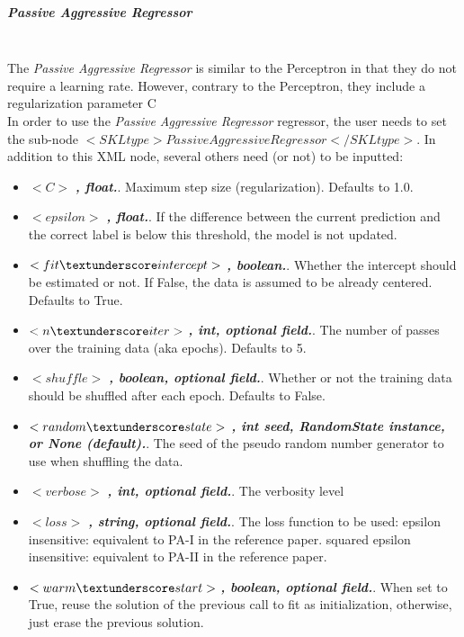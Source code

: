 \subparagraph{Passive Aggressive Regressor}
\mbox{}
\\The \textit{Passive Aggressive Regressor} is similar to the Perceptron in that they do not require a learning rate. However, contrary to the Perceptron, they include a regularization parameter C
\\In order to use the \textit{Passive Aggressive Regressor} regressor, the user needs to set the sub-node $<SKLtype>PassiveAggressiveRegressor</SKLtype>$.
In addition to this XML node, several others need (or not) to be inputted:
\begin{itemize}
  \item $<C>$ \textbf{\textit{, float.}}. Maximum step size (regularization). Defaults to 1.0.
  \item $<epsilon>$ \textbf{\textit{, float.}}. If the difference between the current prediction and the correct label is below this threshold, the model is not updated.
  \item $<fit \textunderscore intercept>$ \textbf{\textit{, boolean.}}. Whether the intercept should be estimated or not. If False, the data is assumed to be already centered. Defaults to True.
  \item $<n \textunderscore iter>$ \textbf{\textit{, int, optional field.}}. The number of passes over the training data (aka epochs). Defaults to 5.
  \item $<shuffle>$ \textbf{\textit{, boolean, optional field.}}. Whether or not the training data should be shuffled after each epoch. Defaults to False.
  \item $<random \textunderscore state>$ \textbf{\textit{, int seed, RandomState instance, or None (default).}}. The seed of the pseudo random number generator to use when shuffling the data.
  \item $<verbose>$ \textbf{\textit{, int, optional field.}}. The verbosity level
  \item $<loss>$ \textbf{\textit{, string, optional field.}}. The loss function to be used: epsilon \textunderscore insensitive: equivalent to PA-I in the reference paper. squared \textunderscore epsilon \textunderscore insensitive: equivalent to PA-II in the reference paper.
  \item $<warm \textunderscore start>$ \textbf{\textit{, boolean, optional field.}}. When set to True, reuse the solution of the previous call to fit as initialization, otherwise, just erase the previous solution.
\end{itemize}

